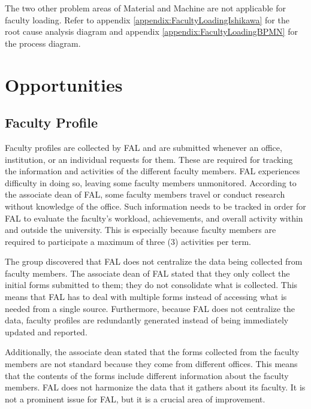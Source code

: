 The two other problem areas of Material and Machine are not applicable for faculty loading. Refer to appendix \ref{appendix:FacultyLoadingIshikawa} for the root cause analysis diagram and appendix \ref{appendix:FacultyLoadingBPMN} for the process diagram.

\section{Opportunities}

\subsection{Faculty Profile}
Faculty profiles are collected by FAL and are submitted whenever an office, institution, or an individual requests for them. These are required for tracking the information and activities of the different faculty members. FAL experiences difficulty in doing so, leaving some faculty members unmonitored. According to the associate dean of FAL, some faculty members travel or conduct research without knowledge of the office. Such information needs to be tracked in order for FAL to evaluate the faculty’s workload, achievements, and overall activity within and outside the university. This is especially because faculty members are required to participate a maximum of three (3) activities per term.

The group discovered that FAL does not centralize the data being collected from faculty members. The associate dean of FAL stated that they only collect the initial forms submitted to them; they do not consolidate what is collected. This means that FAL has to deal with multiple forms instead of accessing what is needed from a single source. Furthermore, because FAL does not centralize the data, faculty profiles are redundantly generated instead of being immediately updated and reported.

Additionally, the associate dean stated that the forms collected from the faculty members are not standard because they come from different offices. This means that the contents of the forms include different information about the faculty members. FAL does not harmonize the data that it gathers about its faculty. It is not a prominent issue for FAL, but it is a crucial area of improvement.